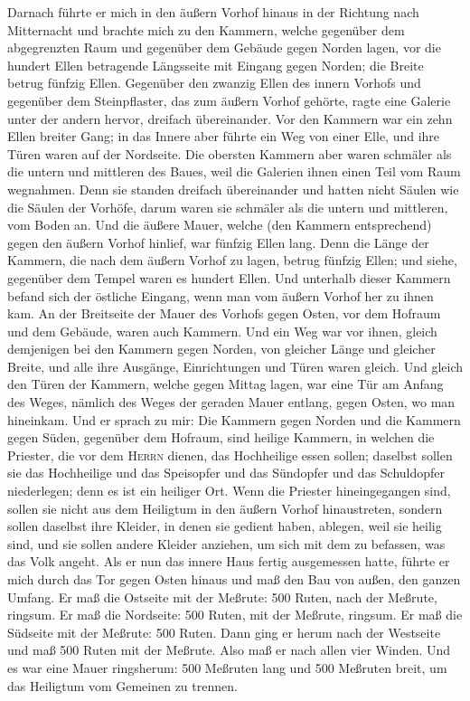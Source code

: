  Darnach führte er mich in den äußern Vorhof hinaus in der
Richtung nach Mitternacht und brachte mich zu den Kammern, welche
gegenüber dem abgegrenzten Raum und gegenüber dem Gebäude gegen Norden
lagen,  vor die hundert Ellen betragende Längsseite mit
Eingang gegen Norden; die Breite betrug fünfzig Ellen. 
Gegenüber den zwanzig Ellen des innern Vorhofs und gegenüber dem
Steinpflaster, das zum äußern Vorhof gehörte, ragte eine Galerie unter
der andern hervor, dreifach übereinander.  Vor den Kammern
war ein zehn Ellen breiter Gang; in das Innere aber führte ein Weg von
einer Elle, und ihre Türen waren auf der Nordseite.  Die
obersten Kammern aber waren schmäler als die untern und mittleren des
Baues, weil die Galerien ihnen einen Teil vom Raum wegnahmen.
 Denn sie standen dreifach übereinander und hatten nicht
Säulen wie die Säulen der Vorhöfe, darum waren sie schmäler als die
untern und mittleren, vom Boden an.  Und die äußere Mauer,
welche (den Kammern entsprechend) gegen den äußern Vorhof hinlief, war
fünfzig Ellen lang.  Denn die Länge der Kammern, die nach
dem äußern Vorhof zu lagen, betrug fünfzig Ellen; und siehe, gegenüber
dem Tempel waren es hundert Ellen.  Und unterhalb dieser
Kammern befand sich der östliche Eingang, wenn man vom äußern Vorhof her
zu ihnen kam.  An der Breitseite der Mauer des Vorhofs
gegen Osten, vor dem Hofraum und dem Gebäude, waren auch Kammern.
 Und ein Weg war vor ihnen, gleich demjenigen bei den
Kammern gegen Norden, von gleicher Länge und gleicher Breite, und alle
ihre Ausgänge, Einrichtungen und Türen waren gleich.  Und
gleich den Türen der Kammern, welche gegen Mittag lagen, war eine Tür am
Anfang des Weges, nämlich des Weges der geraden Mauer entlang, gegen
Osten, wo man hineinkam.  Und er sprach zu mir: Die
Kammern gegen Norden und die Kammern gegen Süden, gegenüber dem Hofraum,
sind heilige Kammern, in welchen die Priester, die vor dem
\textsc{Herrn} dienen, das Hochheilige essen sollen; daselbst sollen sie
das Hochheilige und das Speisopfer und das Sündopfer und das Schuldopfer
niederlegen; denn es ist ein heiliger Ort.  Wenn die
Priester hineingegangen sind, sollen sie nicht aus dem Heiligtum in den
äußern Vorhof hinaustreten, sondern sollen daselbst ihre Kleider, in
denen sie gedient haben, ablegen, weil sie heilig sind, und sie sollen
andere Kleider anziehen, um sich mit dem zu befassen, was das Volk
angeht.  Als er nun das innere Haus fertig ausgemessen
hatte, führte er mich durch das Tor gegen Osten hinaus und maß den Bau
von außen, den ganzen Umfang.  Er maß die Ostseite mit
der Meßrute: 500 Ruten, nach der Meßrute, ringsum.  Er
maß die Nordseite: 500 Ruten, mit der Meßrute, ringsum. 
Er maß die Südseite mit der Meßrute: 500 Ruten.  Dann
ging er herum nach der Westseite und maß 500 Ruten mit der Meßrute.
 Also maß er nach allen vier Winden. Und es war eine
Mauer ringsherum: 500 Meßruten lang und 500 Meßruten breit, um das
Heiligtum vom Gemeinen zu trennen.

